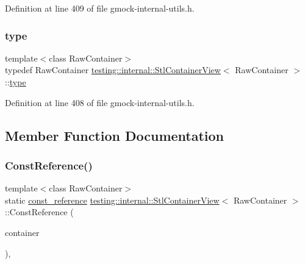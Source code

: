 Definition at line 409 of file gmock-\/internal-\/utils.\+h.

\mbox{\label{classtesting_1_1internal_1_1StlContainerView_a2b2c63a6dcdbfe63fb0ee121ebf463ba}} 
\subsubsection{\texorpdfstring{type}{type}}
{\footnotesize\ttfamily template$<$class Raw\+Container$>$ \\
typedef Raw\+Container \hyperlink{classtesting_1_1internal_1_1StlContainerView}{testing\+::internal\+::\+Stl\+Container\+View}$<$ Raw\+Container $>$\+::\hyperlink{classtesting_1_1internal_1_1StlContainerView_a2b2c63a6dcdbfe63fb0ee121ebf463ba}{type}}



Definition at line 408 of file gmock-\/internal-\/utils.\+h.



\subsection{Member Function Documentation}
\mbox{\label{classtesting_1_1internal_1_1StlContainerView_a36eccf53329730f6e55c12002128bf25}} 
\subsubsection{\texorpdfstring{Const\+Reference()}{ConstReference()}}
{\footnotesize\ttfamily template$<$class Raw\+Container$>$ \\
static \hyperlink{classtesting_1_1internal_1_1StlContainerView_a9cd4f6ed689b3938cdb7b3c4cbf1b36b}{const\+\_\+reference} \hyperlink{classtesting_1_1internal_1_1StlContainerView}{testing\+::internal\+::\+Stl\+Container\+View}$<$ Raw\+Container $>$\+::Const\+Reference (\begin{DoxyParamCaption}\item[{const Raw\+Container \&}]{container }\end{DoxyParamCaption})\hspace{0.3cm}{\ttfamily [inline]}, {\ttfamily [static]}}



